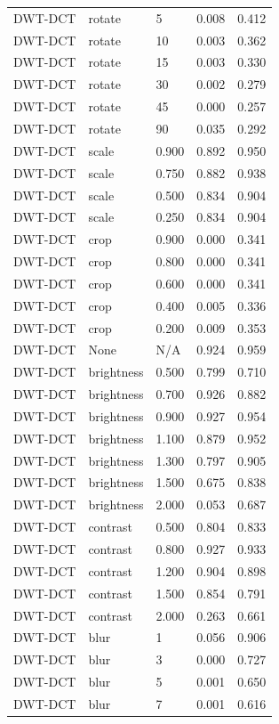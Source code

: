 \begin{table}
\begin{tabular}{lllrr}
DWT-DCT & rotate & 5 & 0.008 & 0.412 \\
DWT-DCT & rotate & 10 & 0.003 & 0.362 \\
DWT-DCT & rotate & 15 & 0.003 & 0.330 \\
DWT-DCT & rotate & 30 & 0.002 & 0.279 \\
DWT-DCT & rotate & 45 & 0.000 & 0.257 \\
DWT-DCT & rotate & 90 & 0.035 & 0.292 \\
DWT-DCT & scale & 0.900 & 0.892 & 0.950 \\
DWT-DCT & scale & 0.750 & 0.882 & 0.938 \\
DWT-DCT & scale & 0.500 & 0.834 & 0.904 \\
DWT-DCT & scale & 0.250 & 0.834 & 0.904 \\
DWT-DCT & crop & 0.900 & 0.000 & 0.341 \\
DWT-DCT & crop & 0.800 & 0.000 & 0.341 \\
DWT-DCT & crop & 0.600 & 0.000 & 0.341 \\
DWT-DCT & crop & 0.400 & 0.005 & 0.336 \\
DWT-DCT & crop & 0.200 & 0.009 & 0.353 \\
DWT-DCT & None & N/A & 0.924 & 0.959 \\
DWT-DCT & brightness & 0.500 & 0.799 & 0.710 \\
DWT-DCT & brightness & 0.700 & 0.926 & 0.882 \\
DWT-DCT & brightness & 0.900 & 0.927 & 0.954 \\
DWT-DCT & brightness & 1.100 & 0.879 & 0.952 \\
DWT-DCT & brightness & 1.300 & 0.797 & 0.905 \\
DWT-DCT & brightness & 1.500 & 0.675 & 0.838 \\
DWT-DCT & brightness & 2.000 & 0.053 & 0.687 \\
DWT-DCT & contrast & 0.500 & 0.804 & 0.833 \\
DWT-DCT & contrast & 0.800 & 0.927 & 0.933 \\
DWT-DCT & contrast & 1.200 & 0.904 & 0.898 \\
DWT-DCT & contrast & 1.500 & 0.854 & 0.791 \\
DWT-DCT & contrast & 2.000 & 0.263 & 0.661 \\
DWT-DCT & blur & 1 & 0.056 & 0.906 \\
DWT-DCT & blur & 3 & 0.000 & 0.727 \\
DWT-DCT & blur & 5 & 0.001 & 0.650 \\
DWT-DCT & blur & 7 & 0.001 & 0.616 \\

\end{tabular}
\end{table}
